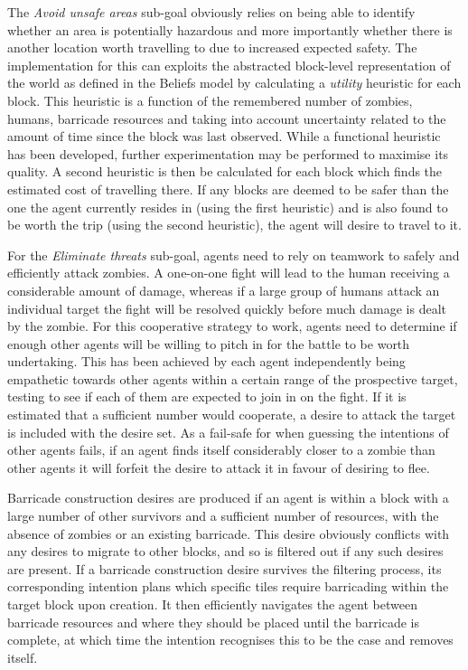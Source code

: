 \documentclass[a4paper,12pt]{article}
\begin{document}
The \emph{Avoid unsafe areas} sub-goal obviously relies on being able to identify whether an area is potentially hazardous and more importantly whether there is another location worth travelling to due to increased expected safety. The implementation for this can exploits the abstracted block-level representation of the world as defined in the Beliefs model by calculating a \emph{utility} heuristic for each block. This heuristic is a function of the remembered number of zombies, humans, barricade resources and taking into account uncertainty related to the amount of time since the block was last observed. While a functional heuristic has been developed, further experimentation may be performed to maximise its quality. A second heuristic is then be calculated for each block which finds the estimated cost of travelling there. If any blocks are deemed to be safer than the one the agent currently resides in (using the first heuristic) and is also found to be worth the trip (using the second heuristic), the agent will desire to travel to it.

For the \emph{Eliminate threats} sub-goal, agents need to rely on teamwork to safely and efficiently attack zombies. A one-on-one fight will lead to the human receiving a considerable amount of damage, whereas if a large group of humans attack an individual target the fight will be resolved quickly before much damage is dealt by the zombie. For this cooperative strategy to work, agents need to determine if enough other agents will be willing to pitch in for the battle to be worth undertaking. This has been achieved by each agent independently being empathetic towards other agents within a certain range of the prospective target, testing to see if each of them are expected to join in on the fight. If it is estimated that a sufficient number would cooperate, a desire to attack the target is included with the desire set. As a fail-safe for when guessing the intentions of other agents fails, if an agent finds itself considerably closer to a zombie than other agents it will forfeit the desire to attack it in favour of desiring to flee.

Barricade construction desires are produced if an agent is within a block with a large number of other survivors and a sufficient number of resources, with the absence of zombies or an existing barricade. This desire obviously conflicts with any desires to migrate to other blocks, and so is filtered out if any such desires are present. If a barricade construction desire survives the filtering process, its corresponding intention plans which specific tiles require barricading within the target block upon creation. It then efficiently navigates the agent between barricade resources and where they should be placed until the barricade is complete, at which time the intention recognises this to be the case and removes itself.
\end{document}
